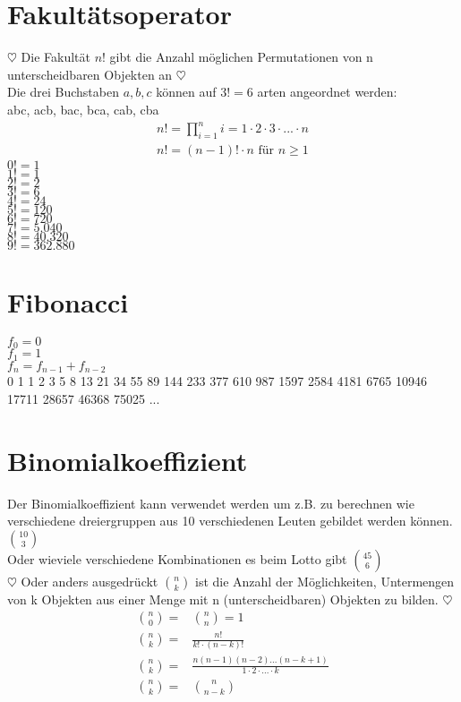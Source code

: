 \documentclass[a4paper]{scrartcl}
\begin{document}
\section{Fakultätsoperator}
$\heartsuit$
Die Fakultät $n!$ gibt die Anzahl möglichen Permutationen von n unterscheidbaren Objekten an $\heartsuit$ \\ \newline
 Die drei Buchstaben $a, b, c$ können auf $3!=6$ arten angeordnet werden: \\
abc, acb, bac, bca, cab, cba \\
\begin{align}
n!= \prod\limits_{i=1}^n i = 1 \cdot 2 \cdot 3  \cdot ...  \cdot n \\
n!=(n-1)! \cdot n \text{ für } n \geq 1
\end{align}
$0!=1 $ \\
$1!=1 $ \\
$2!=2 $ \\
$3!=6 $ \\
$4!=24 $ \\
$5!=120 $ \\
$6!=720 $ \\
$7!=5.040 $ \\
$8!=40.320 $ \\
$9!=362.880 $ \\

\section{Fibonacci}
$f_0=0$ \\
$f_1=1$ \\
$f_n=f_{n-1}+f_{n-2} $ \\
0 1 1 2 3 5 8 13 21 34 55 89 144 233 377 610 987 1597 2584 4181 6765 10946 17711 28657 46368 75025 ...

\section{Binomialkoeffizient}
Der Binomialkoeffizient kann verwendet werden um z.B. zu berechnen wie verschiedene dreiergruppen aus 10 verschiedenen Leuten gebildet werden können.  $\binom{10}{3}$ \\
Oder wieviele verschiedene Kombinationen es beim Lotto gibt $\binom{45}{6}$ \\ \newline
$\heartsuit$
Oder anders ausgedrückt $\binom{n}{k}$ ist die Anzahl der Möglichkeiten, Untermengen von k Objekten aus einer Menge mit n (unterscheidbaren) Objekten zu bilden. $\heartsuit$
\begin{align}
\binom{n}{0}=&\binom{n}{n}=1 \\
\binom{n}{k} =& \frac{n!}{k! \cdot (n-k)!} \\
\binom{n}{k} =& \frac{n(n-1)(n-2)...(n-k+1)}{1 \cdot 2 \cdot ... \cdot k} \\
\binom{n}{k} =& \binom{n}{n-k}
\end{align}
\end{document}
